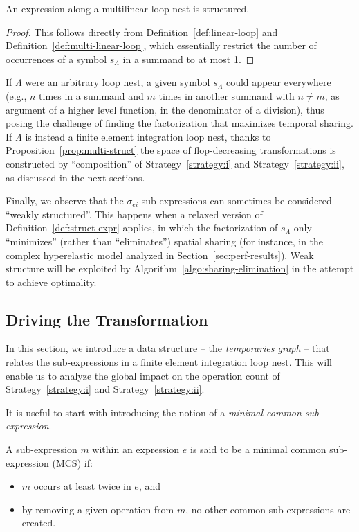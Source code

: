 \begin{Prop}
\label{prop:multi-struct}
An expression along a multilinear loop nest is structured.
\end{Prop}
\begin{proof}
This follows directly from Definition~\ref{def:linear-loop} and Definition~\ref{def:multi-linear-loop}, which essentially restrict the number of occurrences of a symbol $s_{\Lambda}$ in a summand to at most 1.
\end{proof}
If $\Lambda$ were an arbitrary loop nest, a given symbol $s_{\Lambda}$ could appear everywhere (e.g., $n$ times in a summand and $m$ times in another summand with $n \neq m$, as argument of a higher level function, in the denominator of a division), thus posing the challenge of finding the factorization that maximizes temporal sharing. If $\Lambda$ is instead a finite element integration loop nest, thanks to Proposition~\ref{prop:multi-struct} the space of flop-decreasing transformations is constructed by ``composition'' of Strategy~\ref{strategy:i} and Strategy~\ref{strategy:ii}, as discussed in the next sections.

Finally, we observe that the $\sigma_{ei}$ sub-expressions can sometimes be considered ``weakly structured''. This happens when a relaxed version of Definition~\ref{def:struct-expr} applies, in which the factorization of $s_{\Lambda}$ only ``minimizes'' (rather than ``eliminates'') spatial sharing (for instance, in the complex hyperelastic model analyzed in Section~\ref{sec:perf-results}). Weak structure will be exploited by Algorithm~\ref{algo:sharing-elimination} in the attempt to achieve optimality.


\subsection{Driving the Transformation}
In this section, we introduce a data structure -- the {\em temporaries graph} -- that relates the sub-expressions in a finite element integration loop nest. This will enable us to analyze the global impact on the operation count of Strategy~\ref{strategy:i} and Strategy~\ref{strategy:ii}.

It is useful to start with introducing the notion of a {\em minimal common sub-expression}.

\begin{Def}
A sub-expression $m$ within an expression $e$ is said to be a minimal common sub-expression (MCS) if:
\begin{itemize}
\item $m$ occurs at least twice in $e$, and
\item by removing a given operation from $m$, no other common sub-expressions are created.
\end{itemize}
\end{Def}

